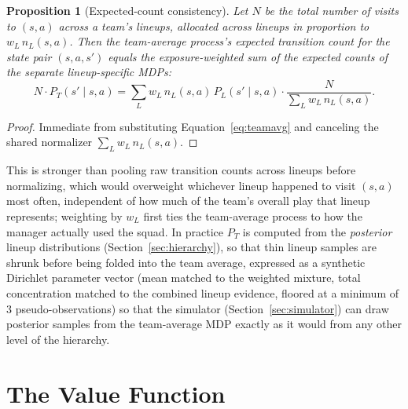 \documentclass[11pt]{article}
\theoremstyle{plain}
\newtheorem{proposition}{Proposition}[section]
\theoremstyle{definition}
\theoremstyle{remark}
\begin{document}
\begin{proposition}[Expected-count consistency]
Let $N$ be the total number of visits to $(s,a)$ across a team's lineups, allocated across lineups in proportion to $w_L\, n_L(s,a)$. Then the team-average process's expected transition count for the state pair $(s,a,s')$ equals the exposure-weighted sum of the expected counts of the separate lineup-specific MDPs:
\begin{equation}
N \cdot P_T(s' \mid s,a) = \sum_L w_L\, n_L(s,a)\, P_L(s' \mid s,a) \cdot \frac{N}{\sum_L w_L\, n_L(s,a)}.
\end{equation}
\end{proposition}
\begin{proof}
Immediate from substituting Equation~\eqref{eq:teamavg} and canceling the shared normalizer $\sum_L w_L\, n_L(s,a)$.
\end{proof}

This is stronger than pooling raw transition counts across lineups before normalizing, which would overweight whichever lineup happened to visit $(s,a)$ most often, independent of how much of the team's overall play that lineup represents; weighting by $w_L$ first ties the team-average process to how the manager actually used the squad. In practice $P_T$ is computed from the \emph{posterior} lineup distributions (Section~\ref{sec:hierarchy}), so that thin lineup samples are shrunk before being folded into the team average, expressed as a synthetic Dirichlet parameter vector (mean matched to the weighted mixture, total concentration matched to the combined lineup evidence, floored at a minimum of 3 pseudo-observations) so that the simulator (Section~\ref{sec:simulator}) can draw posterior samples from the team-average MDP exactly as it would from any other level of the hierarchy.

\section{The Value Function}
\label{sec:valuefunction}
\end{document}
